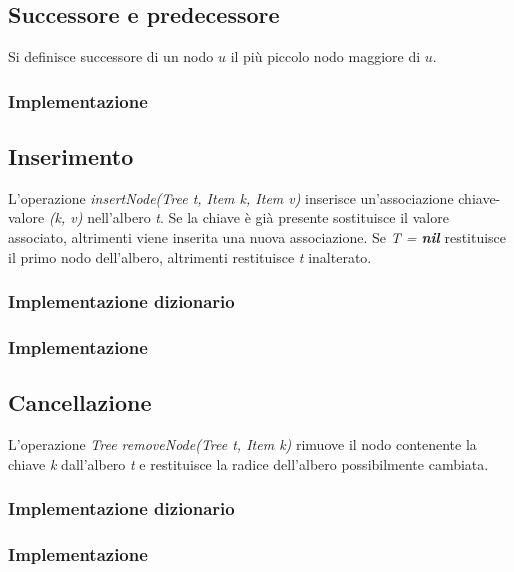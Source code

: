 \subsection{Successore e predecessore}
Si definisce successore di un nodo $u$ il pi\`u piccolo nodo maggiore di $u$.
\subsubsection{Implementazione}
\begin{multicols}{2}
    
    \columnbreak
    
\end{multicols}
\subsection{Inserimento}
L'operazione \emph{insertNode(Tree t, Item k, Item v)} inserisce un'associazione chiave-valore \emph{(k, v)} nell'albero \emph{t}. Se la chiave \`e gi\`a
presente sostituisce il valore associato, altrimenti viene inserita una nuova associazione. Se \emph{T = \textbf{nil}} restituisce il primo nodo
dell'albero, altrimenti restituisce \emph{t} inalterato.
\subsubsection{Implementazione dizionario}

\subsubsection{Implementazione}


\subsection{Cancellazione}
L'operazione \emph{Tree removeNode(Tree t, Item k)} rimuove il nodo contenente la chiave \emph{k} dall'albero \emph{t} e restituisce la radice dell'albero
possibilmente cambiata.
\subsubsection{Implementazione dizionario}

\subsubsection{Implementazione}

